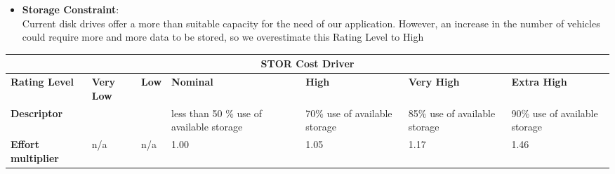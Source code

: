 \begin{itemize}
\item \textbf{Storage Constraint}: \\Current disk drives offer a more than suitable capacity for the need of our application. However, an increase in the number of vehicles could require more and more data to be stored, so we overestimate this Rating Level to High
\end{itemize}
\hspace*{-3cm}\begin{tabular}{|p{3cm}|p{2cm}|p{2cm}|p{2cm}|p{2cm}|p{2cm}|p{2cm}|}
\hline
\multicolumn{7}{|c|}{\textbf{STOR Cost Driver}}\\
\hline
\hline
\textbf{Rating Level} & \textbf{Very Low} & \textbf{Low} & \textbf{Nominal} & \textbf{High} & \textbf{Very High} & \textbf{Extra High}\\
\hline
\textbf{Descriptor} &  &  & less than 50 \% use of available storage & 70\% use of available storage & 85\% use of available storage& 90\% use of available storage\\
\hline
\textbf{Effort multiplier} & n/a & n/a & 1.00 & 1.05 & 1.17 & 1.46\\
\hline 
\end{tabular}